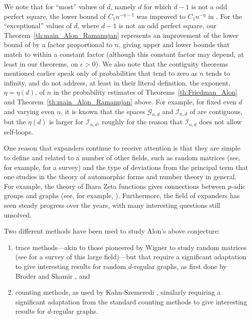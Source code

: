 \documentclass{memo-l}
\theoremstyle{plain}
\theoremstyle{definition}
\numberwithin{section}{chapter}
\numberwithin{equation}{chapter}
\theoremstyle{plain}
\theoremstyle{definition}
\newcommand\cG{\mathcal{G}}
\newcommand\cI{\mathcal{I}}
\begin{document}
We note that for ``most'' values of $d$, namely $d$ for which
$d-1$ is not a odd perfect square, the lower bound of $C_1 n^{-\eta-1}$
was improved to $C_1 n^{-\eta}$ in \cite{friedman_alon}.
For the ``exceptional'' values of $d$, where $d-1$ is not an odd perfect
square,
our Theorem~\ref{th:main_Alon_Ramanujan} represents an improvement
of the lower bound of \cite{friedman_alon} by a factor proportional to
$n$, giving upper and lower bounds that match to within a constant
factor (although this constant factor may depend, at least in
our theorems, on $\epsilon>0$).
We also note that the contiguity theorems mentioned earlier speak
only of probabilities that tend to zero as $n$ tends to infinity,
and do not address, at least in their literal definition,
the exponent, $\eta=\eta(d)$, of $n$ in the probability
estimates of Theorems~\ref{th:Friedman_Alon} and
Theorem~\ref{th:main_Alon_Ramanujan} above.
For example, for fixed even $d$ and varying even $n$,
it is known that the spaces $\cG_{n,d}$
and $\cI_{n,d}$ of \cite{friedman_alon} are contiguous, but the
$\eta(d)$ is larger for $\cI_{n,d}$, roughly for the reason that
$\cI_{n,d}$ does not allow self-loops.

One reason that expanders continue to receive attention is that they
are simple to define and related to a number of other fields, such
as random matrices 
(see, for example, 
\cite{tao_vu_survey} for a survey) 
and the type of deviations from the principal term
that one studies in the theory of automorphic forms and number theory
in general.
For example, 
the theory
of Ihara Zeta functions
gives connections
between $p$-adic groups and graphs (see, for example, \cite{st1,st2,st3}).
Furthermore, the field of expanders has seen steady progress
over the years, with many interesting questions still unsolved.

Two different methods have been used to study Alon's above conjecture:
\begin{enumerate}
\item trace methods---akin to those pioneered by Wigner \cite{wigner} to study
random matrices (see \cite{tao_vu_survey} for a survey of 
this large field)---but 
that require a significant adaptation
to give interesting results for random $d$-regular graphs, as first
done by Broder and Shamir \cite{broder}, and 
\item counting methods, as used by 
Kahn-Szemeredi \cite{friedman_kahn_szemeredi}, similarly requiring
a significant adaptation from the standard counting methods to
give interesting results for $d$-regular graphs.
\end{enumerate}
\end{document}
